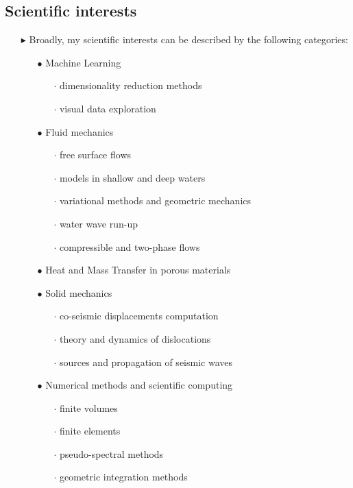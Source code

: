 \subsection{Scientific interests}
\begin{itemize}
  \item[$\blacktriangleright$] Broadly, my scientific interests can be described by the following categories:
  \begin{itemize}
    \item[$\bullet$] Machine Learning
    \begin{itemize}
      \item[$\cdot$] dimensionality reduction methods
      \item[$\cdot$] visual data exploration 
    \end{itemize}
	  \item[$\bullet$] Fluid mechanics
	  \begin{itemize}
	    \item[$\cdot$] free surface flows
	    \item[$\cdot$] models in shallow and deep waters
	    \item[$\cdot$] variational methods and geometric mechanics
	    \item[$\cdot$] water wave run-up
	    \item[$\cdot$] compressible and two-phase flows
	  \end{itemize}
	  \item[$\bullet$] Heat and Mass Transfer in porous materials
	  \item[$\bullet$] Solid mechanics
	  \begin{itemize}
	    \item[$\cdot$] co-seismic displacements computation
	    \item[$\cdot$] theory and dynamics of dislocations
	    \item[$\cdot$] sources and propagation of seismic waves
	  \end{itemize}
	  \item[$\bullet$] Numerical methods and scientific computing
	  \begin{itemize}
	    \item[$\cdot$] finite volumes
	    \item[$\cdot$] finite elements
	    \item[$\cdot$] pseudo-spectral methods
	    \item[$\cdot$] geometric integration methods
	  \end{itemize}

\end{itemize}
\end{itemize}
